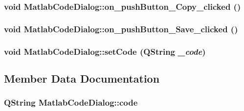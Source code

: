 \hypertarget{class_matlab_code_dialog_e09e39d39463a89b053873b69f8d17d6}{
\subsubsection[{on\_\-pushButton\_\-Copy\_\-clicked}]{\setlength{\rightskip}{0pt plus 5cm}void MatlabCodeDialog::on\_\-pushButton\_\-Copy\_\-clicked ()}}
\label{class_matlab_code_dialog_e09e39d39463a89b053873b69f8d17d6}


\hypertarget{class_matlab_code_dialog_d9cbd8464303a8fc08a85d8f5c0a6259}{
\subsubsection[{on\_\-pushButton\_\-Save\_\-clicked}]{\setlength{\rightskip}{0pt plus 5cm}void MatlabCodeDialog::on\_\-pushButton\_\-Save\_\-clicked ()}}
\label{class_matlab_code_dialog_d9cbd8464303a8fc08a85d8f5c0a6259}


\hypertarget{class_matlab_code_dialog_f98746af9478794fb531433d1d71e49e}{
\subsubsection[{setCode}]{\setlength{\rightskip}{0pt plus 5cm}void MatlabCodeDialog::setCode (QString {\em \_\-code})}}
\label{class_matlab_code_dialog_f98746af9478794fb531433d1d71e49e}




\subsection{Member Data Documentation}
\hypertarget{class_matlab_code_dialog_56cc3f80d70000fe5979f8439b628afb}{
\subsubsection[{code}]{\setlength{\rightskip}{0pt plus 5cm}QString {\bf MatlabCodeDialog::code}}}
\label{class_matlab_code_dialog_56cc3f80d70000fe5979f8439b628afb}


